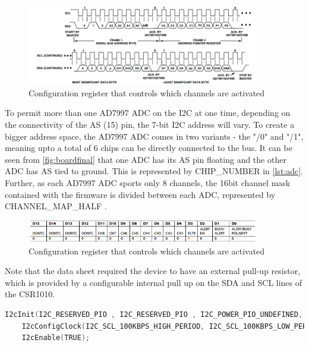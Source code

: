 \documentclass[]{article}
\begin{document}
\begin{figure}[H]
	\begin{center}
		\includegraphics[width = 0.9\textwidth]{waveform}
	\end{center}
	\caption{Configuration register that controls which channels are activated}
	\label{fig:waveform}
\end{figure}

To permit more than one AD7997 \ac{ADC} on the I2C at one time, depending on the connectivity of the AS (15) pin, the 7-bit I2C address will vary. To create a bigger address space, the AD7997 \ac{ADC} comes in two variants - the "/0" and "/1", meaning upto a total of 6 chips can be directly connected to the bus. It can be seen from \ref{fig:boardfinal} that one \ac{ADC} has its AS pin floating and the other \ac{ADC} has AS tied to ground. This is represented by CHIP\_NUMBER in \ref{lst:adc}. Further, as each AD7997 \ac{ADC} sports only 8 channels, the 16bit channel mask contained with the firmware is divided between each \ac{ADC}, represented by CHANNEL\_MAP\_HALF .


\begin{figure}[H]
	\begin{center}
		\includegraphics[width = 0.9\textwidth]{configreg}
	\end{center}
	\caption{Configuration register that controls which channels are activated}
	\label{fig:configreg}
\end{figure}


Note that the data sheet \cite{ad7997} required the device to have an external pull-up resistor, which is provided by a configurable internal pull up on the SDA and SCL lines of the CSR1010.


\begin{lstlisting}[language=C]
    I2cInit(I2C_RESERVED_PIO , I2C_RESERVED_PIO , I2C_POWER_PIO_UNDEFINED, pio_mode_strong_pull_up);
    I2cConfigClock(I2C_SCL_100KBPS_HIGH_PERIOD, I2C_SCL_100KBPS_LOW_PERIOD);
    I2cEnable(TRUE);
\end{lstlisting}
\end{document}
